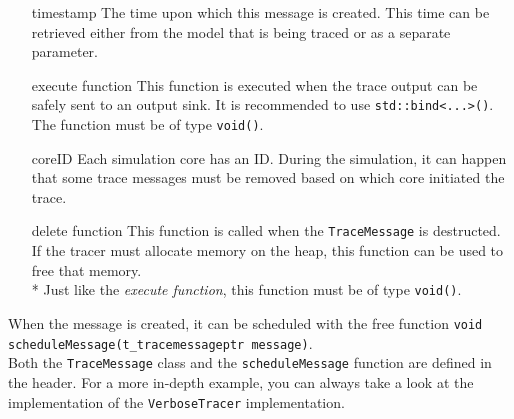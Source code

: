 \begin{itemize}
	\item[timestamp] The time upon which this message is created. This time can be retrieved either from the model that is being traced or as a separate parameter.
	\item[execute function] This function is executed when the trace output can be safely sent to an output sink. It is recommended to use \lstinline{std::bind<...>()}. The function must be of type \lstinline{void()}.
	\item[coreID] Each simulation core has an ID. During the simulation, it can happen that some trace messages must be removed based on which core initiated the trace.
	\item[delete function] This function is called when the \lstinline{TraceMessage} is destructed. If the tracer must allocate memory on the heap, this function can be used to free that memory.\\*
		Just like the \emph{execute function}, this function must be of type \lstinline{void()}.
\end{itemize}
When the message is created, it can be scheduled with the free function \lstinline{void scheduleMessage(t_tracemessageptr message)}.\\
Both the \lstinline{TraceMessage} class and the \lstinline{scheduleMessage} function are defined in the  header. For a more in-depth example, you can always take a look at the implementation of the \lstinline{VerboseTracer} implementation.